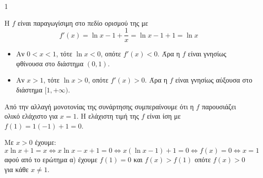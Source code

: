 \begin{ylh}{1}
    \item [Ύλη από εικόνα]
\end{ylh}
\begin{alist}
\item[α)] Η $f$ είναι παραγωγίσιμη στο πεδίο ορισμού της με
\[ f'(x) = \ln x - 1 + \frac{1}{x} = \ln x - 1 + 1 = \ln x \]
\begin{itemize}
    \item Αν $0 < x < 1$, τότε $\ln x < 0$, οπότε $f'(x) < 0$. Άρα η $f$ είναι γνησίως φθίνουσα στο διάστημα $(0,1)$.
    \item Αν $x > 1$, τότε $\ln x > 0$, οπότε $f'(x) > 0$. Άρα η $f$ είναι γνησίως αύξουσα στο διάστημα $[1, +\infty)$.
\end{itemize}
Από την αλλαγή μονοτονίας της συνάρτησης συμπεραίνουμε ότι η $f$ παρουσιάζει ολικό ελάχιστο για $x=1$. Η ελάχιστη τιμή της $f$ είναι ίση με $f(1)=1(-1)+1=0$.

\item[β)] Με $x > 0$ έχουμε:
\[ x \ln x + 1 = x \iff x \ln x - x + 1 = 0 \iff x(\ln x - 1) + 1 = 0 \iff f(x) = 0 \iff x=1 \]
αφού από το ερώτημα α) έχουμε $f(1)=0$ και $f(x) > f(1)$ οπότε $f(x) > 0$ για κάθε $x \neq 1$.
\end{alist}